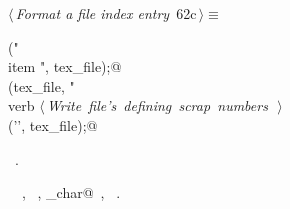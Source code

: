 \documentclass[a4paper]{report}
\begin{document}
\begin{flushleft} \small
\begin{minipage}{\linewidth}\label{scrap121}\raggedright\small
{} $\langle\,${\it Format a file index entry}\nobreak\ {\footnotesize {62c}}$\,\rangle\equiv$
\vspace{-1ex}
\begin{list}{}{} \item
\mbox{}\verb@fputs("\\item ", tex_file);@\\
\mbox{}\verb@fprintf(tex_file, "\\verb%c\"%s\"%c ", nw_char, name->spelling, nw_char);@\\
\mbox{}\verb@@\hbox{$\langle\,${\it Write file's defining scrap numbers}\nobreak\ {\footnotesize {}}$\,\rangle$}\verb@@\\
\mbox{}\verb@putc('\n', tex_file);@{\NWsep}
\end{list}
\vspace{-1.5ex}
\footnotesize
\begin{list}{}{\setlength{\itemsep}{-\parsep}\setlength{\itemindent}{-\leftmargin}}
\item \NWtxtMacroRefIn\ .
\item \NWtxtIdentsUsed\nobreak\  \verb@fprintf@\nobreak\ , \verb@fputs@\nobreak\ , \verb@nw_char@\nobreak\ , \verb@putc@\nobreak\ .
\item{}
\end{list}
\end{minipage}\vspace{4ex}
\end{flushleft}
\end{document}
